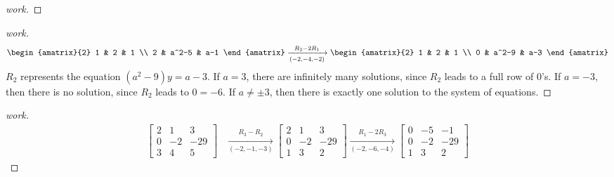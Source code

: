 \documentclass{article}
\begin{document}
\begin{enumerate}
\begin{proof}[work]
  \end{proof}
  \begin{proof}[work]
    \begin{align*}
      \begin{amatrix}{2}
        1 & 2     & 1 \\
        2 & a^2-5 & a-1
      \end{amatrix} \xrightarrow[(-2,-4,-2)]{R_2 - 2R_1}
      \begin{amatrix}{2}
        1 & 2     & 1 \\
        0 & a^2-9 & a-3
      \end{amatrix}
    \end{align*}
    $R_2$ represents the equation $(a^2-9)y = a-3$. If $a = 3$, there are infinitely many solutions, since $R_2$ leads to a full row of $0$'s. If $a = -3$, then there is no solution, since $R_2$ leads to $0 = -6$. If $a \neq \pm 3$, then there is exactly one solution to the system of equations.
  \end{proof}
  \begin{proof}[work]
    \begin{align*}
      \begin{bmatrix}
        2 & 1  & 3   \\
        0 & -2 & -29 \\
        3 & 4  & 5
      \end{bmatrix} & \xrightarrow[(-2,-1,-3)]{R_3 - R_2}
      \begin{bmatrix}
        2 & 1  & 3   \\
        0 & -2 & -29 \\
        1 & 3  & 2
      \end{bmatrix} \xrightarrow[(-2,-6,-4)]{R_1 - 2R_3}
      \begin{bmatrix}
        0 & -5 & -1  \\
        0 & -2 & -29 \\
        1 & 3  & 2

\end{bmatrix}
\end{align*}
\end{proof}
\end{enumerate}
\end{document}
